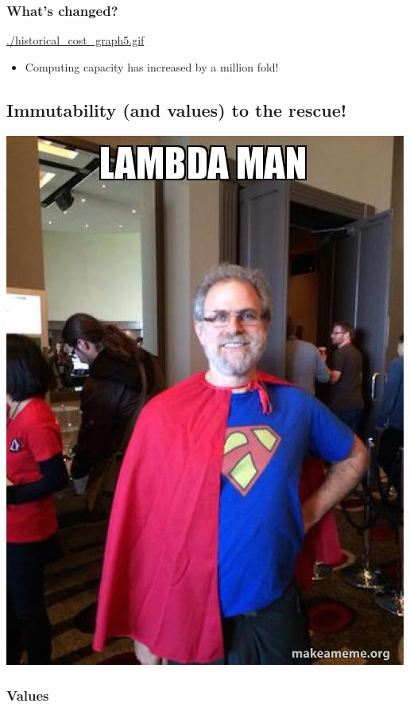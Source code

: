 \documentclass[11pt]{article}
\begin{document}
\subsubsection*{What's changed?}
\label{sec:orgheadline15}
\url{./historical_cost_graph5.gif}

\begin{itemize}
\item Computing capacity has increased by a million fold!
\end{itemize}

\subsection*{Immutability (and values) to the rescue!}
\label{sec:orgheadline19}

\includegraphics[width=.9\linewidth]{./lambda-man.jpg}

\subsubsection*{Values}
\label{sec:orgheadline17}
\end{document}
